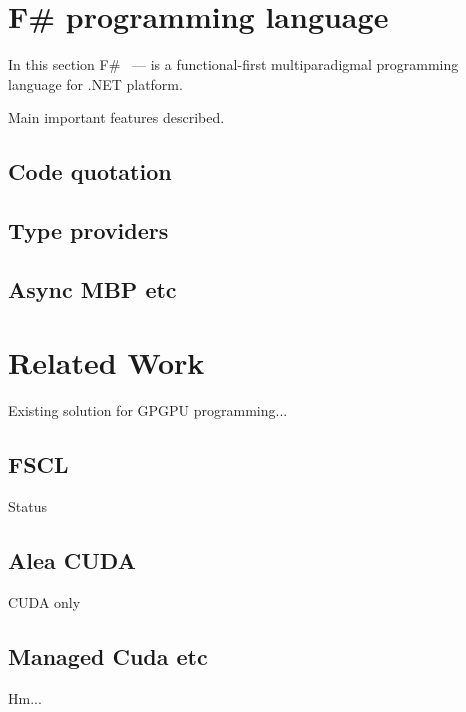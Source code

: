 \section{F\# programming language}

In this section F\#~\cite{fsharp} --- is a functional-first multiparadigmal programming language for .NET platform.

Main important features described.

\subsection{Code quotation}
\subsection{Type providers}
\subsection{Async MBP etc}

\section{Related Work}

Existing solution for GPGPU programming...

\subsection{FSCL}

Status~\cite{FSCLPhD}

\subsection{Alea CUDA}

CUDA only

\subsection{Managed Cuda etc}

Hm...